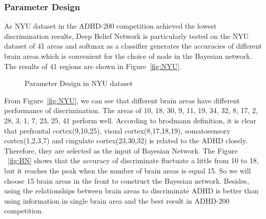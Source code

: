 \documentclass[10pt,twocolumn,letterpaper]{article}
\begin{document}
\subsubsection{Parameter Design}
As NYU dataset in the ADHD-200 competition achieved the lowest discrimination results, Deep Belief Network is particularly tested on the NYU dataset of 41 areas and softmax as a classifier generates the accuracies of different brain areas,which is convenient for the choice of node in the Bayesian network. The results of 41 regions are shown in Figure~\ref{fig:NYU}.
\begin{figure}[ht]
\begin{center}
   \caption{Parameter Design in NYU dataset}
\end{center}
\end{figure}


From Figure~\ref{fig:NYU}, we can see that different brain areas have different performance of discrimination. The areas of 10, 18, 30, 9, 11, 19, 34, 32, 8, 17, 2, 28, 3, 1, 7, 23, 25, 41 perform well. According to brodmann definition, it is clear that prefrontal cortex(9,10,25), visual cortex(8,17,18,19), somatosensory cortex(1,2,3,7) and cingulate cortex(23,30,32) is related to the ADHD closely. Therefore, they are selected as the input of Bayesian Network.  The Figure ~\ref{fig:BN} shows that the accuracy of discriminate fluctuate a little from 10 to 18, but it reaches the peak when the number of brain areas is equal 15. So we will choose 15 brain areas in the front to construct the Bayesian network. Besides, using the relationships between brain areas to discriminate ADHD is better than using information in single brain area and the best result in  ADHD-200 competition.
\end{document}
